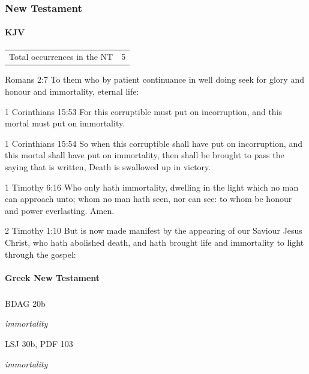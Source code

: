 	\subsubsection{New Testament} %
		\label{IMMORTALITY-NT}
	
		\paragraph{KJV}
			\label{IMMORTALITY-NT-KJV}
			
	
			\begin{tabular}{ll}
				Total occurrences in the NT & 5
			\end{tabular}
			
			\begin{compactdesc}
				\item[Romans 2:7] To them who by patient continuance in well doing seek for glory and honour and immortality, eternal life:
				\item[1 Corinthians 15:53] For this corruptible must put on incorruption, and this mortal must put on immortality.
				\item[1 Corinthians 15:54] So when this corruptible shall have put on incorruption, and this mortal shall have put on immortality, then shall be brought to pass the saying that is written, Death is swallowed up in victory.
				\item[1 Timothy 6:16] Who only hath immortality, dwelling in the light which no man can approach unto; whom no man hath seen, nor can see: to whom be honour and power everlasting. Amen.
				\item[2 Timothy 1:10] But is now made manifest by the appearing of our Saviour Jesus Christ, who hath abolished death, and hath brought life and immortality to light through the gospel:
			\end{compactdesc}
			
		\paragraph{Greek New Testament}
			\label{IMMORTALITY-GREEK}
		
			\subparagraph{\texorpdfstring{}{}}
				\label{ATHANASIA}
			
				\begin{compactdesc}
					\item[BDAG 20b] \textbf{}
						\begin{compactitem}
							\item \textit{immortality}
						\end{compactitem}
					\item[LSJ 30b, PDF 103] \textbf{}
						\begin{compactitem}
							\item \textit{immortality}
						\end{compactitem}
				\end{compactdesc}
				

